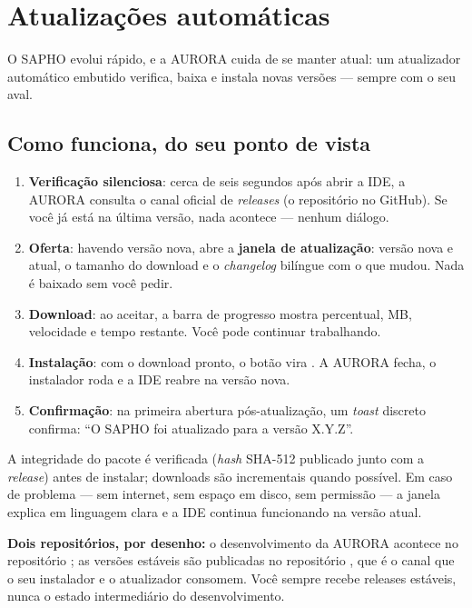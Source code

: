 \chapter{Atualizações automáticas}
\label{cap:atualizacoes}

O SAPHO evolui rápido, e a AURORA cuida de se manter atual: um atualizador automático embutido verifica, baixa e instala novas versões --- sempre com o seu aval.

\section{Como funciona, do seu ponto de vista}

\begin{enumerate}
  \item \textbf{Verificação silenciosa}: cerca de seis segundos após abrir a IDE, a AURORA consulta o canal oficial de \emph{releases} (o repositório  no GitHub). Se você já está na última versão, nada acontece --- nenhum diálogo.
  \item \textbf{Oferta}: havendo versão nova, abre a \textbf{janela de atualização}: versão nova e atual, o tamanho do download e o \emph{changelog} bilíngue com o que mudou. Nada é baixado sem você pedir.
  \item \textbf{Download}: ao aceitar, a barra de progresso mostra percentual, MB, velocidade e tempo restante. Você pode continuar trabalhando.
  \item \textbf{Instalação}: com o download pronto, o botão vira . A AURORA fecha, o instalador roda e a IDE reabre na versão nova.
  \item \textbf{Confirmação}: na primeira abertura pós-atualização, um \emph{toast} discreto confirma: \enquote{O SAPHO foi atualizado para a versão X.Y.Z}.
\end{enumerate}


A integridade do pacote é verificada (\emph{hash} SHA-512 publicado junto com a \emph{release}) antes de instalar; downloads são incrementais quando possível. Em caso de problema --- sem internet, sem espaço em disco, sem permissão --- a janela explica em linguagem clara e a IDE continua funcionando na versão atual.

\begin{info}
\textbf{Dois repositórios, por desenho:} o desenvolvimento da AURORA acontece no repositório ; as versões estáveis são publicadas no repositório , que é o canal que o seu instalador e o atualizador consomem. Você sempre recebe releases estáveis, nunca o estado intermediário do desenvolvimento.
\end{info}

